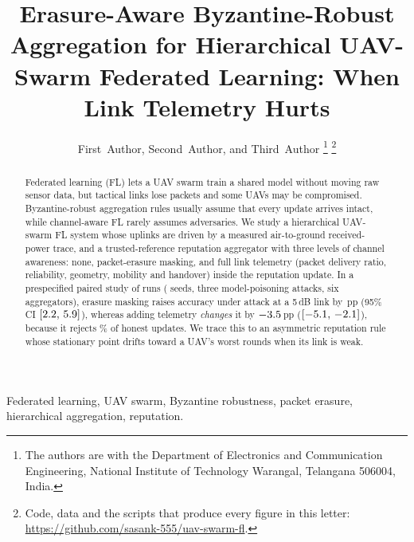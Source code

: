 \documentclass[journal]{IEEEtran}
\newcommand{\pp}{\,pp}
\newcommand{\ci}[2]{$[#1,\,#2]$}
\begin{document}
\title{Erasure-Aware Byzantine-Robust Aggregation for Hierarchical UAV-Swarm Federated Learning: When Link Telemetry Hurts}

\author{%
  First~Author, Second~Author, and Third~Author%
  \thanks{The authors are with the Department of Electronics and Communication Engineering,
  National Institute of Technology Warangal, Telangana 506004, India.}%
  \thanks{Code, data and the scripts that produce every figure in this letter:
  \url{https://github.com/sasank-555/uav-swarm-fl}.}%
}

\maketitle

\begin{abstract}
Federated learning (FL) lets a UAV swarm train a shared model without moving raw
sensor data, but tactical links lose packets and some UAVs may be compromised.
Byzantine-robust aggregation rules usually assume that every update arrives intact,
while channel-aware FL rarely assumes adversaries. We study a hierarchical UAV-swarm
FL system whose uplinks are driven by a measured air-to-ground received-power trace,
and a trusted-reference reputation aggregator with three levels of channel awareness:
none, packet-erasure masking, and full link telemetry (packet delivery ratio,
reliability, geometry, mobility and handover) inside the reputation update. In a
prespecified paired study of \NumRuns{} runs (\NumSeeds{} seeds, three model-poisoning
attacks, six aggregators), erasure masking raises accuracy under attack at a 5\,dB
link by \MaskGain\pp{} (95\% CI \ci{\MaskLo}{\MaskHi}), whereas adding telemetry
\emph{changes} it by $-3.5$\pp{} (\ci{\TelLo}{\TelHi}), because it rejects
\RejCcra\% of honest updates. We trace this to an asymmetric reputation rule whose
stationary point drifts toward a UAV's worst rounds when its link is weak.
\end{abstract}

\begin{IEEEkeywords}
Federated learning, UAV swarm, Byzantine robustness, packet erasure, hierarchical aggregation, reputation.
\end{IEEEkeywords}
\end{document}
